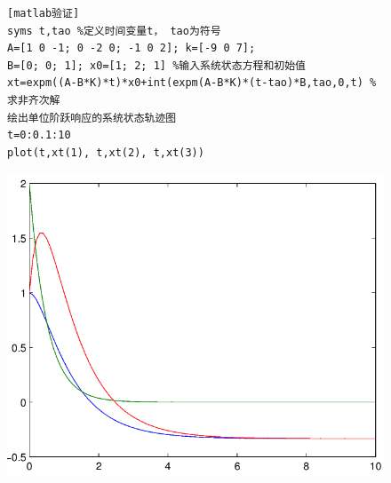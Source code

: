\documentclass{article}
\begin{document}
\begin{figure}[h]
\begin{minipage}[c]{0.45\textwidth}
\begin{verbatim}[matlab验证]
syms t,tao %定义时间变量t， tao为符号
A=[1 0 -1; 0 -2 0; -1 0 2]; k=[-9 0 7];
B=[0; 0; 1]; x0=[1; 2; 1] %输入系统状态方程和初始值
xt=expm((A-B*K)*t)*x0+int(expm(A-B*K)*(t-tao)*B,tao,0,t) %求非齐次解
绘出单位阶跃响应的系统状态轨迹图
t=0:0.1:10
plot(t,xt(1), t,xt(2), t,xt(3))
\end{verbatim}
\end{minipage}
\begin{minipage}[c]{0.5\textwidth}
\includegraphics[width=\textwidth]{num6.png} 
\end{minipage}
\end{figure}
\end{document}
